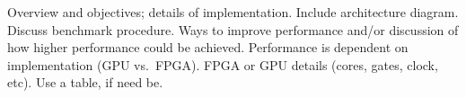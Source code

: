 Overview and objectives; details of implementation.  Include architecture diagram.  Discuss benchmark procedure.  Ways to improve performance and/or discussion of how higher performance could be achieved.  Performance is dependent on implementation (GPU vs.\ FPGA).  FPGA or GPU details (cores, gates, clock, etc).  Use a table, if need be.

